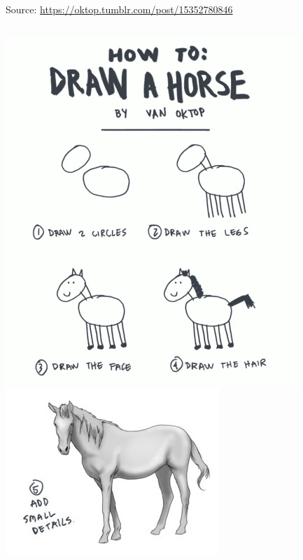 \documentclass[aspectratio=169,usenames,dvipsnames]{beamer}
\begin{document}
\begin{frame}
    \begin{reference}
        \hfill Source: \url{https://oktop.tumblr.com/post/15352780846}
    \end{reference}
    \begin{columns}[b]
            \includegraphics[height=0.9\textheight]{fig/horse1}
        \pause
            \includegraphics[width=0.9\linewidth]{fig/horse2}
    \end{columns}
\end{frame}
\end{document}
